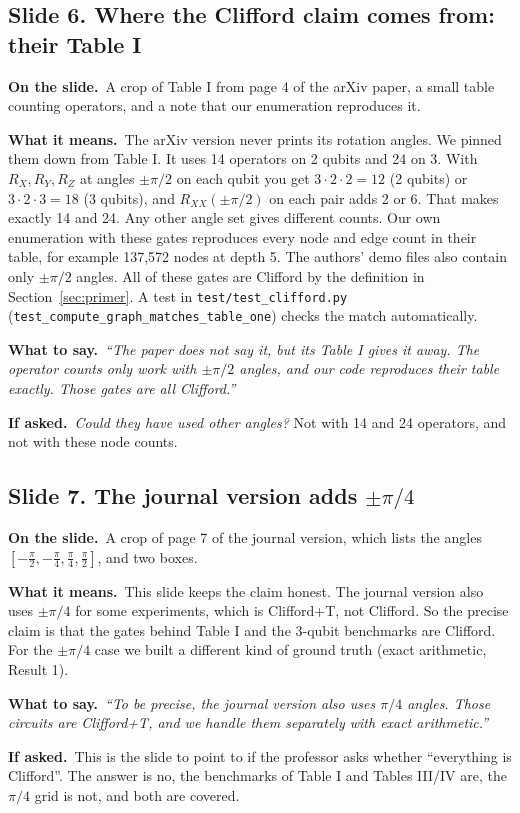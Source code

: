 \documentclass[11pt,a4paper]{article}
\newcommand{\say}[1]{\emph{``#1''}}
\newcommand{\slide}[2]{\subsection*{Slide #1. #2}}
\newcommand{\shows}{\par\textbf{\color{ibar}On the slide.}\ }
\newcommand{\means}{\par\textbf{\color{ibar}What it means.}\ }
\newcommand{\tosay}{\par\textbf{\color{ibar}What to say.}\ }
\newcommand{\ifasked}{\par\textbf{\color{ibar}If asked.}\ }
\begin{document}
\slide{6}{Where the Clifford claim comes from: their Table I}
\shows A crop of Table I from page 4 of the arXiv paper, a small table counting operators, and a note that our
enumeration reproduces it.
\means The arXiv version never prints its rotation angles. We pinned them down from Table I. It uses 14 operators on 2
qubits and 24 on 3. With $R_X,R_Y,R_Z$ at angles $\pm\pi/2$ on each qubit you get $3\cdot2\cdot2=12$ (2 qubits) or
$3\cdot2\cdot3=18$ (3 qubits), and $R_{XX}(\pm\pi/2)$ on each pair adds 2 or 6. That makes exactly 14 and 24. Any other
angle set gives different counts. Our own enumeration with these gates reproduces every node and edge count in their
table, for example 137,572 nodes at depth 5. The authors' demo files also contain only $\pm\pi/2$ angles. All of these
gates are Clifford by the definition in Section~\ref{sec:primer}. A test in \texttt{test/test\_clifford.py}
(\texttt{test\_compute\_graph\_\allowbreak matches\_table\_one}) checks the match automatically.
\tosay \say{The paper does not say it, but its Table I gives it away. The operator counts only work with $\pm\pi/2$
angles, and our code reproduces their table exactly. Those gates are all Clifford.}
\ifasked \emph{Could they have used other angles?} Not with 14 and 24 operators, and not with these node counts.

\slide{7}{The journal version adds $\pm\pi/4$}
\shows A crop of page 7 of the journal version, which lists the angles $[-\frac\pi2,-\frac\pi4,\frac\pi4,\frac\pi2]$, and
two boxes.
\means This slide keeps the claim honest. The journal version also uses $\pm\pi/4$ for some experiments, which is
Clifford+T, not Clifford. So the precise claim is that the gates behind Table I and the 3-qubit benchmarks are Clifford.
For the $\pm\pi/4$ case we built a different kind of ground truth (exact arithmetic, Result 1).
\tosay \say{To be precise, the journal version also uses $\pi/4$ angles. Those circuits are Clifford+T, and we handle them
separately with exact arithmetic.}
\ifasked This is the slide to point to if the professor asks whether ``everything is Clifford''. The answer is no, the
benchmarks of Table I and Tables III/IV are, the $\pi/4$ grid is not, and both are covered.
\end{document}
